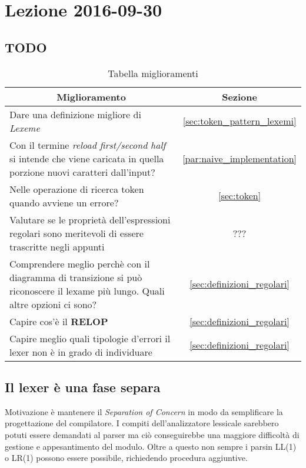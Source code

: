 \section{Lezione 2016-09-30}
\subsection{TODO}
\begin{table}[H]
\begin{center}
\begin{tabular}{|p{\textwidth}|c|}
\hline
\multicolumn{1}{|c|}{\textbf{Miglioramento}} & \textbf{Sezione} \\ \hline
Dare una definizione migliore di \textit{Lexeme} &
\ref{sec:token_pattern_lexemi} \\ \hline
Con il termine \textit{reload first/second half} si intende che viene caricata
in quella porzione nuovi caratteri dall'input? &
\ref{par:naive_implementation} \\ \hline
Nelle operazione di ricerca token quando avviene un errore? &
\ref{sec:token} \\ \hline
Valutare se le proprietà dell'espressioni regolari sono meritevoli di essere
trascritte negli appunti & ??? \\ \hline
Comprendere meglio perchè con il diagramma di transizione si può riconoscere il
lexame più lungo. Quali altre opzioni ci sono? &
\ref{sec:definizioni_regolari} \\ \hline
Capire cos'è il \textbf{RELOP} & \ref{sec:definizioni_regolari} \\ \hline
Capire meglio quali tipologie d'errori il lexer non è in grado di individuare &
\ref{sec:definizioni_regolari} \\ \hline
\end{tabular}
\end{center}
\caption{Tabella miglioramenti}
\label{tab:tab_todo}
\end{table}

\subsection{Il lexer è una fase separa}
Motivazione è mantenere il \textit{Separation of Concern} in modo da
semplificare la progettazione del compilatore. I compiti dell'analizzatore
lessicale sarebbero potuti essere demandati al parser ma ciò conseguirebbe una
maggiore difficoltà di gestione e appesantimento del modulo. Oltre a questo non
sempre i parsin LL(1) o LR(1) possono essere possibile, richiedendo procedura
aggiuntive.

